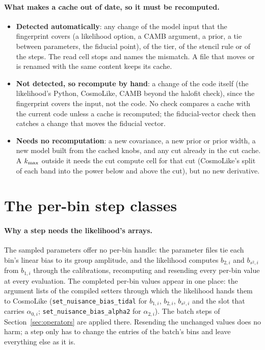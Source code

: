 \documentclass[11pt]{article}
\newcommand{\kmax}{k_{\rm max}}
\newcommand{\us}{\_\allowbreak}
\begin{document}
\paragraph{What makes a cache out of date, so it must be recomputed.}
\begin{itemize}
  \item \textbf{Detected automatically}: any change of the model input
    that the fingerprint covers (a likelihood option, a CAMB argument, a
    prior, a tie between parameters, the fiducial point), of the tier,
    of the stencil rule or of the steps.  The read cell stops and
    names the mismatch.  A file that moves or is renamed with the same
    content
    keeps its cache.
  \item \textbf{Not detected, so recompute by hand}: a change of the
    code itself (the likelihood's Python, CosmoLike, CAMB beyond the
    halofit check), since the fingerprint covers the input, not the
    code.  No check compares a cache with the current code unless a
    cache is recomputed; the fiducial-vector check then catches a change
    that moves the fiducial vector.
  \item \textbf{Needs no recomputation}: a new covariance, a new prior
    or prior width, a new model built from the cached knobs, and any cut
    already in the cut cache.  A $\kmax$ outside it needs the cut
    compute cell for that cut (CosmoLike's split of each band into the
    power below and above the cut), but no new derivative.
\end{itemize}

\appendix

\section{The per-bin step classes}
\label{sec:intercept}

\paragraph{Why a step needs the likelihood's arrays.}
The sampled parameters offer no per-bin handle: the parameter files
tie each bin's linear bias to its group amplitude, and the likelihood
computes $b_{2,i}$ and $b_{s^2,i}$ from $b_{1,i}$ through the
calibrations, recomputing and resending every per-bin value at every
evaluation.  The completed per-bin values appear in one place: the
argument lists of the compiled setters through which the likelihood
hands them to CosmoLike (\texttt{set\us nuisance\us bias\us tidal} for
$b_{1,i}$, $b_{2,i}$, $b_{s^2,i}$ and the slot that carries
$\alpha_{0,i}$; \texttt{set\us nuisance\us bias\us alpha2} for
$\alpha_{2,i}$).  The batch steps of
Section~\ref{sec:operators} are applied there.  Resending the
unchanged values does no harm; a step only has to change the
entries of the batch's bins and leave everything else as it is.
\end{document}
